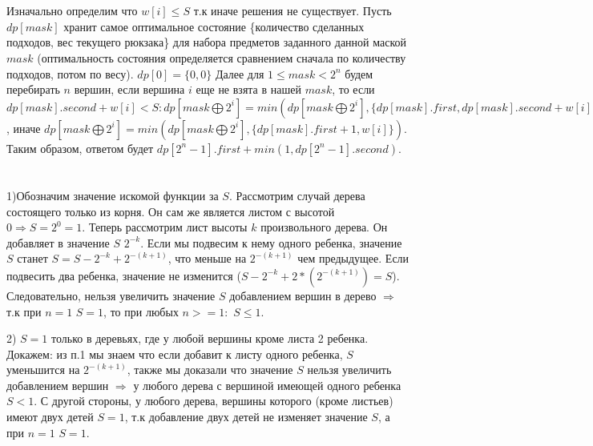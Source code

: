 \documentclass{article}
\begin{document}
\begin{flushleft}
\section{}


\section{}



\section{}
Изначально определим что $w[i] \le S$ т.к иначе решения не существует. Пусть $dp[mask]$ хранит самое оптимальное состояние \{количество сделанных подходов, вес текущего рюкзака\} для набора предметов заданного данной маской $mask$ (оптимальность состояния определяется сравнением сначала по количеству подходов, потом по весу). $dp[0] = \{0, 0\}$ Далее для $1 \le mask < 2^n$ будем перебирать $n$ вершин, если вершина $i$ еще не взята в нашей $mask$, то если $dp[mask].second + w[i] < S: dp[mask \bigoplus 2^i] = min(dp[mask \bigoplus 2^i], \{dp[mask].first, dp[mask].second + w[i]\})$, иначе $dp[mask \bigoplus 2^i] = min(dp[mask \bigoplus 2^i], \{dp[mask].first + 1, w[i]\})$. Таким образом, ответом будет $dp[2^n - 1].first + min(1, dp[2^n - 1].second)$.


\section{}
1)Обозначим значение искомой функции за $S$. Рассмотрим случай дерева состоящего только из корня. Он сам же является листом с высотой $0 \Rightarrow S = 2^0 = 1$. Теперь рассмотрим лист высоты $k$ произвольного дерева. Он добавляет в значение $S$ $2^{-k}$. Если мы подвесим к нему одного ребенка, значение $S$ станет $S = S - 2^{-k} + 2^{-(k + 1)}$, что меньше на $2^{-(k + 1)}$ чем предыдущее. Если подвесить два ребенка, значение не изменится ($S - 2^{-k} + 2 * (2^{-(k + 1)}) = S$). Следовательно, нельзя увеличить значение $S$ добавлением вершин в дерево $\Rightarrow$ т.к при $n = 1$ $S = 1$, то при любых $n >= 1:$ $S \le 1$.

2) $S = 1$ только в деревьях, где у любой вершины кроме листа 2 ребенка. Докажем: из п.1 мы знаем что если добавит к листу одного ребенка, $S$ уменьшится на $2^{-(k + 1)}$, также мы доказали что значение $S$ нельзя увеличить добавлением вершин $\Rightarrow$ у любого дерева с вершиной имеющей одного ребенка $S < 1$. С другой стороны, у любого дерева, вершины которого (кроме листьев) имеют двух детей $S = 1$, т.к добавление двух детей не изменяет значение $S$, а при $n = 1$ $S = 1$.


\section{}



\end{flushleft}
\end{document}
